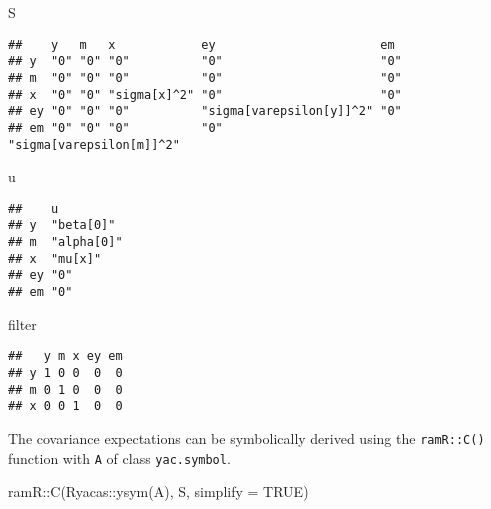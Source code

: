 \documentclass[
]{book}
\newenvironment{Shaded}{\begin{snugshade}}{\end{snugshade}}
\newcommand{\AttributeTok}[1]{\textcolor[rgb]{0.77,0.63,0.00}{#1}}
\newcommand{\ConstantTok}[1]{\textcolor[rgb]{0.00,0.00,0.00}{#1}}
\newcommand{\FunctionTok}[1]{\textcolor[rgb]{0.00,0.00,0.00}{#1}}
\newcommand{\NormalTok}[1]{#1}
\newcommand{\SpecialCharTok}[1]{\textcolor[rgb]{0.00,0.00,0.00}{#1}}
\theoremstyle{definition}
\theoremstyle{definition}
\theoremstyle{definition}
\theoremstyle{remark}
\begin{document}
\begin{Shaded}
\begin{Highlighting}[]
\NormalTok{S}
\end{Highlighting}
\end{Shaded}

\begin{verbatim}
##    y   m   x            ey                       em                      
## y  "0" "0" "0"          "0"                      "0"                     
## m  "0" "0" "0"          "0"                      "0"                     
## x  "0" "0" "sigma[x]^2" "0"                      "0"                     
## ey "0" "0" "0"          "sigma[varepsilon[y]]^2" "0"                     
## em "0" "0" "0"          "0"                      "sigma[varepsilon[m]]^2"
\end{verbatim}

\begin{Shaded}
\begin{Highlighting}[]
\NormalTok{u}
\end{Highlighting}
\end{Shaded}

\begin{verbatim}
##    u         
## y  "beta[0]" 
## m  "alpha[0]"
## x  "mu[x]"   
## ey "0"       
## em "0"
\end{verbatim}

\begin{Shaded}
\begin{Highlighting}[]
\NormalTok{filter}
\end{Highlighting}
\end{Shaded}

\begin{verbatim}
##   y m x ey em
## y 1 0 0  0  0
## m 0 1 0  0  0
## x 0 0 1  0  0
\end{verbatim}

The covariance expectations
can be symbolically derived using the \texttt{ramR::C()} function
with \texttt{A} of class \texttt{yac.symbol}.

\begin{Shaded}
\begin{Highlighting}[]
\NormalTok{ramR}\SpecialCharTok{::}\FunctionTok{C}\NormalTok{(Ryacas}\SpecialCharTok{::}\FunctionTok{ysym}\NormalTok{(A), S, }\AttributeTok{simplify =} \ConstantTok{TRUE}\NormalTok{)}
\end{Highlighting}
\end{Shaded}
\end{document}
